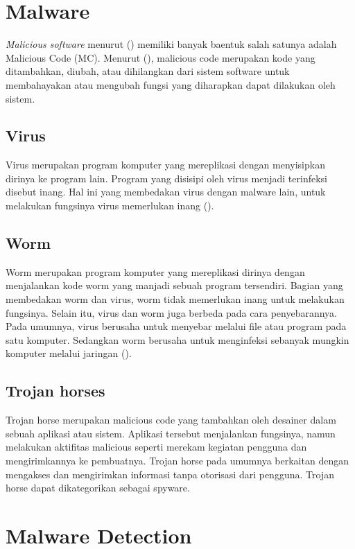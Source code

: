 \section{Malware}
\textit{Malicious software} menurut (\cite{idika2007survey}) memiliki banyak baentuk salah satunya adalah Malicious Code (MC). Menurut (\cite{attackingmalcode}), malicious code merupakan kode yang ditambahkan, diubah, atau dihilangkan dari sistem software untuk membahayakan atau mengubah fungsi yang diharapkan dapat dilakukan oleh sistem.

\subsection{Virus}
Virus merupakan program komputer yang mereplikasi dengan menyisipkan dirinya ke program lain. Program yang disisipi oleh virus menjadi terinfeksi disebut inang. Hal ini yang membedakan virus dengan malware lain, untuk melakukan fungsinya virus memerlukan inang (\cite{attackingmalcode}). 

\subsection{Worm}
Worm merupakan program komputer yang mereplikasi dirinya dengan menjalankan kode worm yang manjadi sebuah program tersendiri. Bagian yang membedakan worm dan virus, worm tidak memerlukan inang untuk melakukan fungsinya. Selain itu, virus dan worm juga berbeda pada cara penyebarannya. Pada umumnya, virus berusaha untuk menyebar melalui file atau program pada satu komputer. Sedangkan worm berusaha untuk menginfeksi sebanyak mungkin komputer melalui jaringan (\cite{attackingmalcode}).

\subsection{Trojan horses}
Trojan horse merupakan malicious code yang tambahkan oleh desainer dalam sebuah aplikasi atau sistem. Aplikasi tersebut menjalankan fungsinya, namun melakukan aktifitas malicious seperti merekam kegiatan pengguna dan mengirimkannya ke pembuatnya. Trojan horse pada umumnya berkaitan dengan mengakses dan mengirimkan informasi tanpa otorisasi dari pengguna. Trojan horse dapat dikategorikan sebagai spyware. 


\section{Malware Detection}

